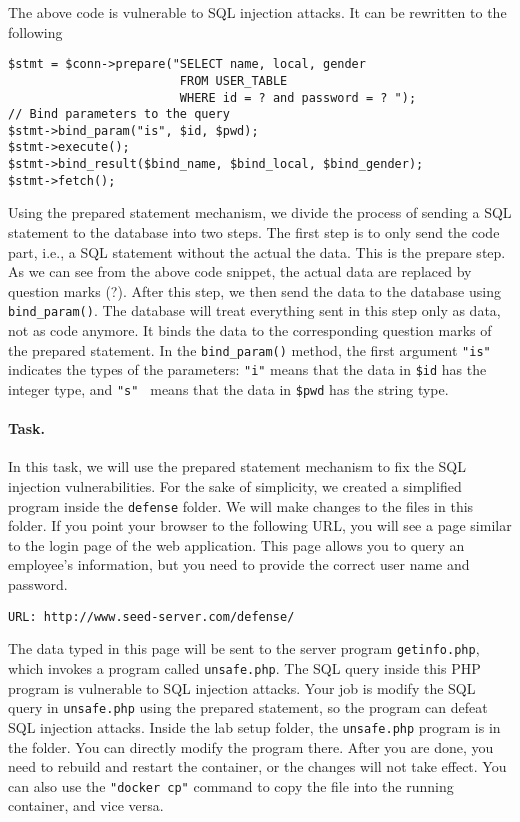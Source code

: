 The above code is vulnerable to SQL injection attacks. 
It can be rewritten to the following


\begin{lstlisting}
$stmt = $conn->prepare("SELECT name, local, gender
                        FROM USER_TABLE 
                        WHERE id = ? and password = ? ");
// Bind parameters to the query
$stmt->bind_param("is", $id, $pwd);
$stmt->execute();
$stmt->bind_result($bind_name, $bind_local, $bind_gender);
$stmt->fetch();
\end{lstlisting}


Using the prepared statement mechanism, we divide the process of sending
a SQL statement to the database into two steps.  
The first step is to only send the code part, i.e., a SQL statement without 
the actual the data. This is the prepare step. As we can see from the 
above code snippet, the actual data are replaced by question
marks (?).  After this step, we then send the data to the database using 
{\tt bind\_param()}.
The database will treat everything sent in this step only as 
data, not as code anymore. It binds the data to the corresponding
question marks of the prepared statement. 
In the {\tt bind\_param()} method, the first argument {\tt "is"} indicates
the types of the parameters: \texttt{"i"} means  
that the data in {\tt \$id} has the integer type,
and \texttt{"s" } means that the data in {\tt \$pwd} has the string type.


\paragraph{Task.} In this task, we will use the prepared statement mechanism to 
fix the SQL injection vulnerabilities. For the sake of simplicity, we 
created a simplified program inside the \texttt{defense} folder. We 
will make changes to the files in this folder. 
If you point your browser to the following URL, you will see a page similar
to the login page of the web application. This page allows you to query an 
employee's information, but you need to provide the correct 
user name and password. 


\begin{lstlisting}
URL: http://www.seed-server.com/defense/
\end{lstlisting}

The data typed in this page will be sent to the 
server program \texttt{getinfo.php}, which 
invokes a program called \texttt{unsafe.php}. 
The SQL query inside this PHP program 
is vulnerable to SQL injection attacks. Your job is modify the SQL 
query in \texttt{unsafe.php} using the prepared statement, so
the program can defeat SQL injection attacks.
Inside the lab setup folder, the \texttt{unsafe.php} program is 
in the  folder. You can directly 
modify the program there. After you are done, you need
to rebuild and restart the container, or the changes will not
take effect. You can also use the \texttt{"docker cp"} command
to copy the file into the running container, and vice versa.

